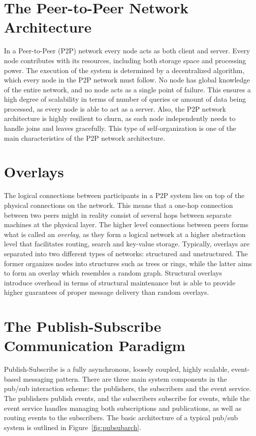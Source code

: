 \section{The Peer-to-Peer Network Architecture}
In a Peer-to-Peer (P2P) network every node acts as both client and
server. Every node contributes with its resources, including both
storage space and processing power. The execution of the system is
determined by a decentralized algorithm, which every node in the P2P
network must follow. No node has global knowledge of the entire network,
and no node acts as a single point of failure. This ensures a high
degree of scalability in terms of number of queries or amount of data
being processed, as every node is able to act as a server. Also, the P2P
network architecture is highly resilient to churn, as each node
independently needs to handle joins and leaves gracefully. This type of
self-organization is one of the main characteristics of the P2P network
architecture.

\section{Overlays}
The logical connections between participants in a P2P
system lies on top of the physical connections on the network. This
means that a one-hop connection between two peers might in reality
consist of several hops between separate machines at the physical layer.
The higher level connections between peers forms what is called an
\emph{overlay}, as they form a logical network at a higher abstraction
level that facilitates routing, search and key-value storage. Typically,
overlays are separated into two different types of networks: structured
and unstructured. The former organizes nodes into structures such as
trees or rings, while the latter aims to form an overlay which resembles
a random graph. Structural overlays introduce overhead in terms of
structural maintenance but is able to provide higher guarantees of
proper message delivery than random overlays.

\section{The Publish-Subscribe Communication Paradigm}
Publish-Subscribe is a fully asynchronous, loosely coupled,
highly scalable, event-based messaging pattern. There are three main
system components in the pub/sub interaction scheme: the publishers, the
subscribers and the event service. The publishers publish events, and
the subscribers subscribe for events, while the event service handles
managing both subscriptions and publications, as well as routing events
to the subscribers. The basic architecture of a typical pub/sub system
is outlined in Figure~\ref{fig:pubsubarch}.

